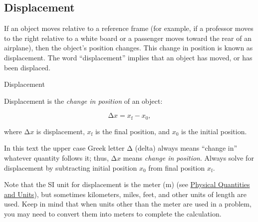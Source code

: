 \documentclass[
]{book}
\newenvironment{note}{}{}
\begin{document}
\hypertarget{fs-id2572460}{}
\hypertarget{displacement-1}{%
\subsection{Displacement}\label{displacement-1}}

If an object moves relative to a reference frame (for example, if a
professor moves to the right relative to a white board or a passenger
moves toward the rear of an airplane), then the object's position
changes. This change in position is known as
{displacement}. The word ``displacement'' implies that
an object has moved, or has been displaced.

\hypertarget{fs-id3206000}{}
\begin{note}

Displacement

Displacement is the \emph{change in position} of an object:

\leavevmode\hypertarget{eip-458}{}%
\[{\text{Δ}x = {x_{\text{f}} - x_{0}},}{}\]

where \({\text{Δ}x}{}\) is displacement, \(x_{\text{f}}{}\) is the final
position, and \emph{}\(x_{0}{}\) is the initial
position.

\end{note}

In this text the upper case Greek letter \(\text{Δ}{}\) (delta) always
means ``change in'' whatever quantity follows it; thus, \({\text{Δ}x}{}\)
means \emph{change in position}. Always solve for displacement by subtracting
initial position \(x_{0}{}\) from final position \(x_{\text{f}}{}\).

Note that the SI unit for displacement is the meter (m) (see \href{/m54765}{Physical
Quantities and Units}), but sometimes kilometers, miles, feet,
and other units of length are used. Keep in mind that when units other
than the meter are used in a problem, you may need to convert them into
meters to complete the calculation.
\end{document}
